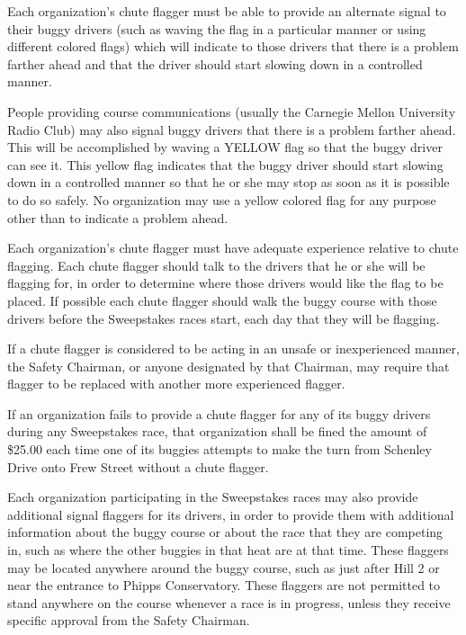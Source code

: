 	Each organization's chute flagger must be able to provide an alternate signal
	to their buggy drivers (such as waving the flag in a particular manner or using
	different colored flags) which will indicate to those drivers that there is a
	problem farther ahead and that the driver should start slowing down in a
	controlled manner.

	People providing course communications (usually the Carnegie Mellon University
	Radio Club) may also signal buggy drivers that there is a problem farther
	ahead. This will be accomplished by waving a YELLOW flag so that the buggy
	driver can see it. This yellow flag indicates that the buggy driver should
	start slowing down in a controlled manner so that he or she may stop as soon as
	it is possible to do so safely. No organization may use a yellow colored flag
	for any purpose other than to indicate a problem ahead.

	Each organization's chute flagger must have adequate experience relative to
	chute flagging. Each chute flagger should talk to the drivers that he or she
	will be flagging for, in order to determine where those drivers would like the
	flag to be placed. If possible each chute flagger should walk the buggy course
	with those drivers before the Sweepstakes races start, each day that they will
	be flagging.

	If a chute flagger is considered to be acting in an unsafe or inexperienced
	manner, the Safety Chairman, or anyone designated by that Chairman, may require
	that flagger to be replaced with another more experienced flagger.

	If an organization fails to provide a chute flagger for any of its buggy
	drivers during any Sweepstakes race, that organization shall be fined the
	amount of \$25.00 each time one of its buggies attempts to make the turn from
	Schenley Drive onto Frew Street without a chute flagger.

	Each organization participating in the Sweepstakes races may also provide
	additional signal flaggers for its drivers, in order to provide them with
	additional information about the buggy course or about the race that they are
	competing in, such as where the other buggies in that heat are at that time.
	These flaggers may be located anywhere around the buggy course, such as just
	after Hill 2 or near the entrance to Phipps Conservatory. These flaggers are
	not permitted to stand anywhere on the course whenever a race is in progress,
	unless they receive specific approval from the Safety Chairman.

